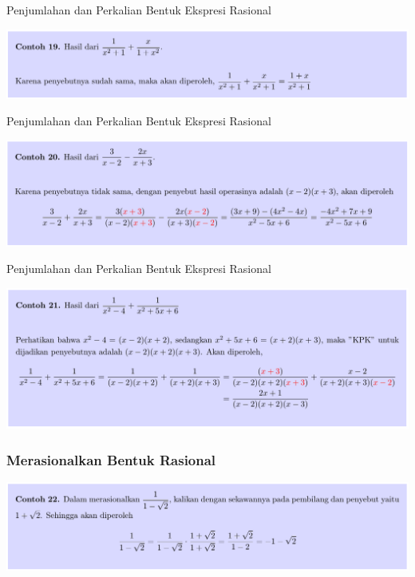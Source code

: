 \documentclass[pdflatex,compress,mathserif]{beamer}
\begin{document}
\begin{frame}{Penjumlahan dan Perkalian Bentuk Ekspresi Rasional}
	\begin{center}
		\includegraphics[width=\linewidth]{img/img37}
	\end{center}
\end{frame}

\begin{frame}{Penjumlahan dan Perkalian Bentuk Ekspresi Rasional}
	\begin{center}
		\includegraphics[width=\linewidth]{img/img38}
	\end{center}
\end{frame}

\begin{frame}{Penjumlahan dan Perkalian Bentuk Ekspresi Rasional}
	\begin{center}
		\includegraphics[width=\linewidth]{img/img39}
	\end{center}
\end{frame}

\begin{frame}
	\frametitle{Merasionalkan Bentuk Rasional}
	\begin{center}
		\includegraphics[width=\linewidth]{img/img40}
	\end{center}
\end{frame}
\end{document}
